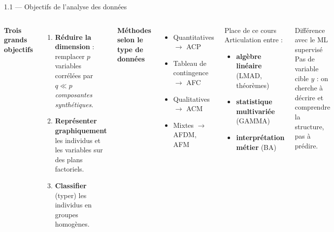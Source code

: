 \begin{frame}{1.1 — Objectifs de l'analyse des données}
\begin{columns}[T]
\textbf{Trois grands objectifs}
\begin{enumerate}
  \item \textbf{Réduire la dimension} : remplacer $p$ variables corrélées
        par $q \ll p$ \emph{composantes synthétiques}.
  \item \textbf{Représenter graphiquement} les individus et les variables
        sur des plans factoriels.
  \item \textbf{Classifier} (typer) les individus en groupes homogènes.
\end{enumerate}

\vspace{0.3cm}
\textbf{Méthodes selon le type de données}
\begin{itemize}\small
  \item Quantitatives $\to$ \alert{ACP}
  \item Tableau de contingence $\to$ \alert{AFC}
  \item Qualitatives $\to$ \alert{ACM}
  \item Mixtes $\to$ AFDM, AFM
\end{itemize}
\begin{block}{Place de ce cours}
  Articulation entre :
  \begin{itemize}\small
    \item \textbf{algèbre linéaire} (LMAD, théorèmes)
    \item \textbf{statistique multivariée} (GAMMA)
    \item \textbf{interprétation métier} (BA)
  \end{itemize}
\end{block}

\begin{alertblock}{Différence avec le ML supervisé}
  Pas de variable cible $y$ : on cherche à \alert{décrire} et
  \alert{comprendre} la structure, pas à \alert{prédire}.
\end{alertblock}
\end{columns}
\end{frame}

